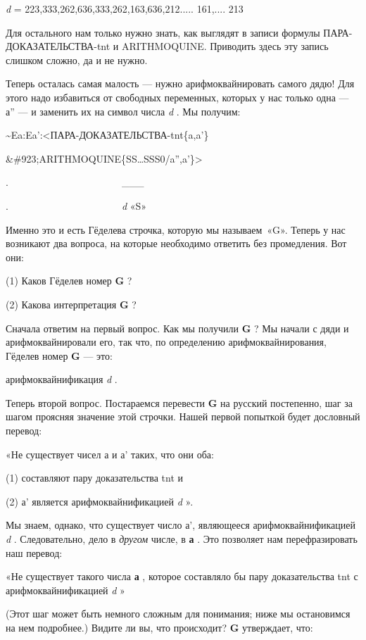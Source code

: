 \documentclass[../main.tex]{subfiles}
\begin{document}
\emph{d} = 223,333,262,636,333,262,163,636,212..... 161,.... 213

Для остального нам только нужно знать, как выглядят в записи формулы ПАРА-ДОКАЗАТЕЛЬСТВА-\acs{tnt} и ARITHMOQUINE. Приводить здесь эту запись слишком сложно, да и не нужно.

Теперь осталась самая малость --- нужно арифмоквайнировать самого дядю! Для этого надо избавиться от свободных переменных, которых у нас только одна --- а'' --- и заменить их на символ числа \emph{d} . Мы получим:

\textasciitilde Ea:Ea':\textless ПАРА-ДОКАЗАТЕЛЬСТВА-\acs{tnt}\{a,a'\}

\&\#923;ARITHMOQUINE\{SS\ldots SSS0/a'',a'\}\textgreater{}

.~~~~~~~~~~~~~~~~~~~~~~~\textbar\_\_\_\textbar{}

.~~~~~~~~~~~~~~~~~~~~~~~\emph{d} «S»~

Именно это и есть Гёделева строчка, которую мы называем~«G». Теперь у нас возникают два вопроса, на которые необходимо ответить без промедления. Вот они:

(1) Каков Гёделев номер \textbf{G} ?

(2) Какова интерпретация \textbf{G} ?

Сначала ответим на первый вопрос. Как мы получили \textbf{G} ? Мы начали с дяди и арифмоквайнировали его, так что, по определению арифмоквайнирования, Гёделев номер \textbf{G} --- это:

арифмоквайнификация \emph{d} .

Теперь второй вопрос. Постараемся перевести \textbf{G} на русский постепенно, шаг за шагом проясняя значение этой строчки. Нашей первой попыткой будет дословный перевод:

«Не существует чисел а и а' таких, что они оба:

(1) составляют пару доказательства \acs{tnt} и

(2) а' является арифмоквайнификацией \emph{d} ».

Мы знаем, однако, что существует число а', являющееся арифмоквайнификацией \emph{d} . Следовательно, дело в \emph{другом} числе, в \textbf{а} . Это позволяет нам перефразировать наш перевод:

«Не существует такого числа \textbf{а} , которое составляло бы пару доказательства \acs{tnt} с арифмоквайнификацией \emph{d} »

(Этот шаг может быть немного сложным для понимания; ниже мы остановимся на нем подробнее.) Видите ли вы, что происходит? \textbf{G} утверждает, что:
\end{document}
